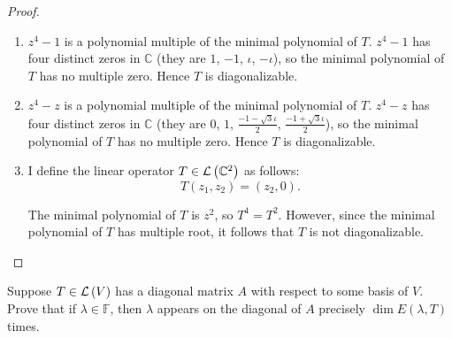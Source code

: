 \begin{proof}
    \begin{enumerate}[label={(\alph*)}]
        \item $z^{4} - 1$ is a polynomial multiple of the minimal polynomial of $T$. $z^{4} - 1$ has four distinct zeros in $\mathbb{C}$ (they are $1$, $-1$, $\iota$, $-\iota$), so the minimal polynomial of $T$ has no multiple zero. Hence $T$ is diagonalizable.
        \item $z^{4} - z$ is a polynomial multiple of the minimal polynomial of $T$. $z^{4} - z$ has four distinct zeros in $\mathbb{C}$ (they are $0$, $1$, $\frac{-1-\sqrt{3}\iota}{2}$, $\frac{-1+\sqrt{3}\iota}{2}$), so the minimal polynomial of $T$ has no multiple zero. Hence $T$ is diagonalizable.
        \item I define the linear operator $T\in\mathcal{L}\left({\mathbb{C}^{2}}\right)$ as follows:
              \[
                  T(z_{1}, z_{2}) = (z_{2}, 0).
              \]

              The minimal polynomial of $T$ is $z^{2}$, so $T^{4} = T^{2}$. However, since the minimal polynomial of $T$ has multiple root, it follows that $T$ is not diagonalizable.
    \end{enumerate}
\end{proof}
\newpage

\begin{exercise}\label{chapter5:sectionD:exercise2}
    Suppose $T\in\mathcal{L}\left({V}\right)$ has a diagonal matrix $A$ with respect to some basis of $V$. Prove that if $\lambda\in\mathbb{F}$, then $\lambda$ appears on the diagonal of $A$ precisely $\dim E(\lambda, T)$ times.
\end{exercise}

